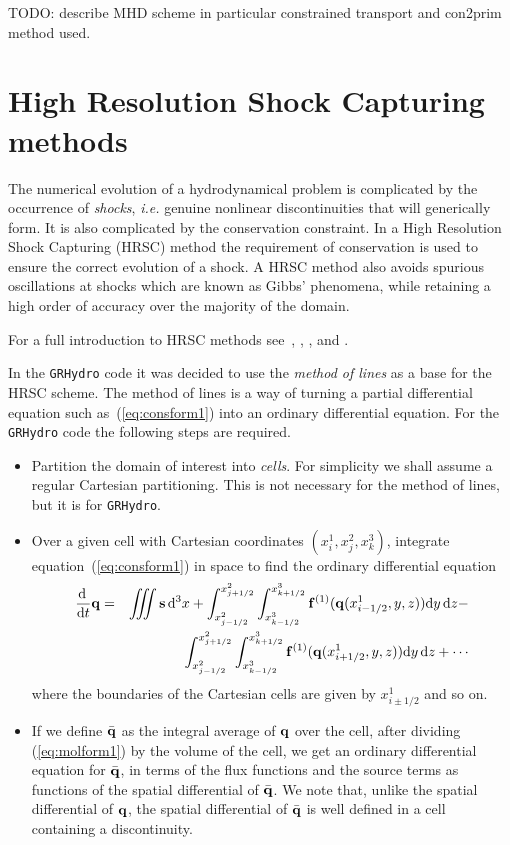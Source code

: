 \documentclass{article}
\begin{document}
TODO: describe MHD scheme in particular constrained transport and con2prim
method used.

\section{High Resolution Shock Capturing methods}
\label{sec:hrsc}

The numerical evolution of a hydrodynamical problem is complicated by
the occurrence of {\it shocks}, {\it i.e.} genuine nonlinear discontinuities that
will generically form. It is also complicated by the conservation
constraint. In a High Resolution Shock Capturing (HRSC) method the
requirement of conservation is used to ensure the correct evolution of
a shock. A HRSC method also avoids spurious oscillations at shocks
which are known as Gibbs' phenomena, while retaining a high order of
accuracy over the majority of the domain.

For a full introduction to HRSC methods see~\cite{laney}, \cite{toro},
\cite{leveque}, \cite{livrevsrrfd} and \cite{livrevgrrfd}.

In the {\tt GRHydro} code it was decided to use the {\it method of lines} as a
base for the HRSC scheme. The method of lines is a way of turning a
partial differential equation such as~(\ref{eq:consform1}) into an
ordinary differential equation. For the {\tt GRHydro} code the following steps
are required.
\begin{itemize}
\item Partition the domain of interest into {\it cells}. For
  simplicity we shall assume a regular Cartesian partitioning. This is
  not necessary for the method of lines, but it is for {\tt GRHydro}.
\item Over a given cell with Cartesian coordinates $(x^1_i, x^2_j, x^3_k)$,
  integrate equation~(\ref{eq:consform1}) in space to find the
  ordinary differential equation
  \begin{eqnarray}
    \label{eq:molform1} \nonumber
    \frac{{\rm d} \,}{{\rm d} t} {\bf q} & = & \int \!\!\!\! \int \!\!\!\!
      \int {\bf s} \,{\rm d}^3 x + \int_{x^2_{j-1/2}}^{x^2_{j+1/2}}
    \int_{x^3_{k-1/2}}^{x^3_{k+1/2}} {\bf f}^{(1)} ({\bf q}
    (x^1_{i-1/2}, y, z)) {\rm d} y \, {\rm d} z - \\
    &&    \int_{x^2_{j-1/2}}^{x^2_{j+1/2}} 
    \int_{x^3_{k-1/2}}^{x^3_{k+1/2}} {\bf f}^{(1)} ({\bf q}
    (x^1_{i+1/2}, y, z))
    {\rm d} y \, {\rm d} z + \cdots
  \end{eqnarray}
  where the boundaries of the Cartesian cells are given by $x^1_{i \pm
  1/2}$ and so on.
\item If we define $\bar{\bf q}$ as the integral average of
  ${\bf q}$ over the cell, after dividing (\ref{eq:molform1}) by the volume of the cell, we get an ordinary
  differential equation for $\bar{\bf q}$, in terms of the flux functions and the
  source terms as functions of the spatial differential of $\bar{{\bf
  q}}$. We note that, unlike the spatial differential of ${\bf q}$,
  the spatial differential of $\bar{{\bf q}}$ is well defined in a
  cell containing a discontinuity. 
\end{itemize}
\end{document}
